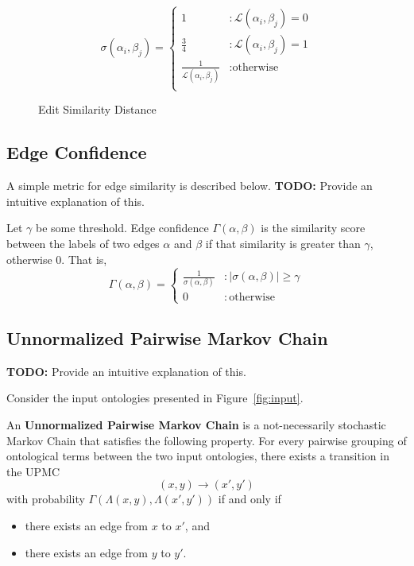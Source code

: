 \documentclass[letterpaper,twocolumn,12pt]{article}
\begin{document}
\begin{figure*}
\centering
\begin{equation*}
\sigma
\left( \alpha_i, \beta_j \right) = \left\{
\begin{array}{ll}
  1           &: \mathcal{L} \left( \alpha_i, \beta_j \right) = 0 \\
  \frac{3}{4} &: \mathcal{L} \left( \alpha_i, \beta_j \right) = 1 \\
  \frac{1}{\mathcal{L} \left( \alpha_i, \beta_j \right)} &: \text{otherwise} \\
\end{array}
\right.
\end{equation*}
\caption{Edit Similarity Distance}
\end{figure*}

\subsection{Edge Confidence}

A simple metric for edge similarity is described below.
\textbf{TODO:} Provide an intuitive explanation of this.

\begin{defn}
Let $\gamma$ be some threshold. Edge confidence $\Gamma \left( \alpha, \beta \right)$ is the similarity score between the labels of two edges $\alpha$ and $\beta$ if that similarity is greater than $\gamma$, otherwise $0$. That is,
$$ \Gamma \left( \alpha, \beta \right) = \left\{
   	 \begin{array}{ll}
           \frac{1}{\sigma \left( \alpha, \beta \right)} & : \vert \sigma \left( \alpha, \beta \right) \vert \geq \gamma \\
           0                                             & : \mathrm{otherwise}
     \end{array}
   \right.$$
\end{defn}

\subsection{Unnormalized Pairwise Markov Chain}
\textbf{TODO:} Provide an intuitive explanation of this.

Consider the input ontologies presented in Figure~\ref{fig:input}.

\begin{defn}
An {\bf Unnormalized Pairwise Markov Chain} is a not-necessarily stochastic Markov Chain that satisfies the following property.
For every pairwise grouping of ontological terms between the two input ontologies, there exists a transition in the UPMC
$$ (x, y) \rightarrow (x', y') $$
with probability $\Gamma(\Lambda(x, y), \Lambda(x', y'))$ if and only if
\begin{itemize}
\item there exists an edge from $x$ to $x'$, and
\item there exists an edge from $y$ to $y'$.
\end{itemize}
\end{defn}
\end{document}
